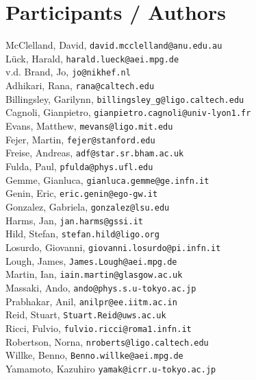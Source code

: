 \chapter{Participants / Authors}
\label{sec:Participants}


McClelland, David, \texttt{david.mcclelland@anu.edu.au}
\\
L\"uck, Harald,   \texttt{harald.lueck@aei.mpg.de} 
\\
v.d. Brand, Jo, \texttt{jo@nikhef.nl} 
\\
Adhikari, Rana, \texttt{rana@caltech.edu}
\\
Billingsley, Garilynn, \texttt{billingsley\_g@ligo.caltech.edu}
\\
Cagnoli, Gianpietro, \texttt{gianpietro.cagnoli@univ-lyon1.fr}
\\
Evans, Matthew, \texttt{mevans@ligo.mit.edu}
\\
Fejer, Martin, \texttt{fejer@stanford.edu}
\\
Freise, Andreas, \texttt{adf@star.sr.bham.ac.uk}
\\
Fulda, Paul, \texttt{pfulda@phys.ufl.edu}
\\
Gemme, Gianluca, \texttt{gianluca.gemme@ge.infn.it}
\\
Genin, Eric, \texttt{eric.genin@ego-gw.it}
\\
Gonzalez, Gabriela, \texttt{gonzalez@lsu.edu}
\\
Harms, Jan, \texttt{jan.harms@gssi.it}
\\
Hild, Stefan, \texttt{stefan.hild@ligo.org}
\\
Losurdo, Giovanni, \texttt{giovanni.losurdo@pi.infn.it}
\\
Lough, James, \texttt{James.Lough@aei.mpg.de}
\\
Martin, Ian, \texttt{iain.martin@glasgow.ac.uk}
\\
Massaki, Ando,  \texttt{ando@phys.s.u-tokyo.ac.jp}
\\
Prabhakar, Anil, \texttt{anilpr@ee.iitm.ac.in}
\\
Reid, Stuart, \texttt{Stuart.Reid@uws.ac.uk}
\\
Ricci, Fulvio, \texttt{fulvio.ricci@roma1.infn.it}
\\
Robertson, Norna, \texttt{nroberts@ligo.caltech.edu}
\\
Willke, Benno, \texttt{Benno.willke@aei.mpg.de}
\\
Yamamoto, Kazuhiro \texttt{yamak@icrr.u-tokyo.ac.jp}

